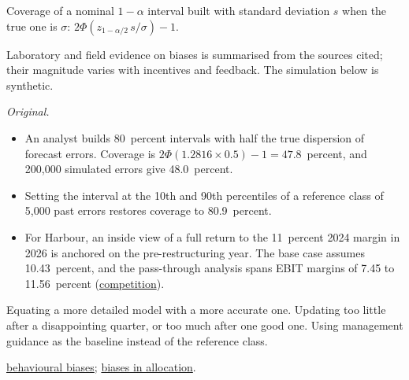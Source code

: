 \begin{qfmethod}
 Coverage of a nominal $1-\alpha$ interval built with standard deviation $s$ when the true one is $\sigma$: $2\Phi(z_{1-\alpha/2}\,s/\sigma)-1$.

 Laboratory and field evidence on biases is summarised from the sources cited; their magnitude varies with incentives and feedback. The simulation below is synthetic.

 \emph{Original.}
\begin{itemize}
\item An analyst builds 80~percent intervals with half the true dispersion of forecast errors. Coverage is $2\Phi(1.2816\times0.5)-1=47.8$~percent, and 200{,}000 simulated errors give 48.0~percent.
\item Setting the interval at the 10th and 90th percentiles of a reference class of 5{,}000 past errors restores coverage to 80.9~percent.
\item For Harbour, an inside view of a full return to the 11~percent 2024 margin in 2026 is anchored on the pre-restructuring year. The base case assumes 10.43~percent, and the pass-through analysis spans EBIT margins of 7.45 to 11.56~percent (\hyperref[meth:competition-inflation-forecasting]{competition}).
\end{itemize}

 Equating a more detailed model with a more accurate one. Updating too little after a disappointing quarter, or too much after one good one. Using management guidance as the baseline instead of the reference class.

 \hyperref[def:behavioural-biases]{behavioural biases}; \hyperref[meth:tactical-shifts-behavioural-biases]{biases in allocation}.

\end{qfmethod}

